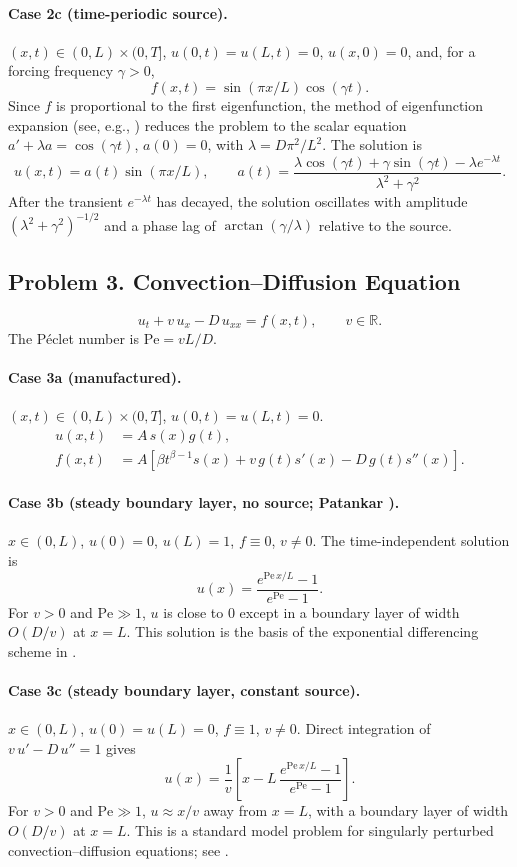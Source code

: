 \documentclass[11pt]{article}
\begin{document}
\paragraph{Case 2c (time-periodic source).}
$(x,t)\in(0,L)\times(0,T]$, $u(0,t)=u(L,t)=0$, $u(x,0)=0$, and, for a
forcing frequency $\gamma>0$,
\[
f(x,t)=\sin(\pi x/L)\cos(\gamma t).
\]
Since $f$ is proportional to the first eigenfunction, the method of
eigenfunction expansion (see, e.g., \cite[Ch.~8]{Hab13}) reduces the
problem to the scalar equation $a'+\lambda a=\cos(\gamma t)$, $a(0)=0$,
with $\lambda=D\pi^2/L^2$. The solution is
\[
u(x,t)=a(t)\sin(\pi x/L),
\qquad
a(t)=\frac{\lambda\cos(\gamma t)+\gamma\sin(\gamma t)-\lambda e^{-\lambda t}}
{\lambda^2+\gamma^2}.
\]
After the transient $e^{-\lambda t}$ has decayed, the solution
oscillates with amplitude $(\lambda^2+\gamma^2)^{-1/2}$ and a phase lag
of $\arctan(\gamma/\lambda)$ relative to the source.

\subsection*{Problem 3. Convection--Diffusion Equation}

\[
\boxed{u_t+v\,u_x-D\,u_{xx}=f(x,t)},
\qquad v\in\mathbb{R}.
\]
The P\'eclet number is $\mathrm{Pe}=vL/D$.

\paragraph{Case 3a (manufactured).}
$(x,t)\in(0,L)\times(0,T]$, $u(0,t)=u(L,t)=0$.
\[
\begin{aligned}
u(x,t)&=A\,s(x)g(t),\\
f(x,t)&=A\left[
\beta t^{\beta-1}s(x)
+v\,g(t)s'(x)-D\,g(t)s''(x)
\right].
\end{aligned}
\]

\paragraph{Case 3b (steady boundary layer, no source; Patankar \cite[Ch.~5]{Pat80}).}
$x\in(0,L)$, $u(0)=0$, $u(L)=1$, $f\equiv0$, $v\neq0$. The
time-independent solution is
\[
u(x)=\frac{e^{\mathrm{Pe}\,x/L}-1}{e^{\mathrm{Pe}}-1}.
\]
For $v>0$ and $\mathrm{Pe}\gg1$, $u$ is close to $0$ except in a boundary layer of
width $O(D/v)$ at $x=L$. This solution is the basis of the exponential
differencing scheme in \cite{Pat80}.

\paragraph{Case 3c (steady boundary layer, constant source).}
$x\in(0,L)$, $u(0)=u(L)=0$, $f\equiv1$, $v\neq0$. Direct integration of
$v\,u'-D\,u''=1$ gives
\[
u(x)=\frac{1}{v}\left[x-L\,\frac{e^{\mathrm{Pe}\,x/L}-1}{e^{\mathrm{Pe}}-1}\right].
\]
For $v>0$ and $\mathrm{Pe}\gg1$, $u\approx x/v$ away from $x=L$, with a
boundary layer of width $O(D/v)$ at $x=L$. This is a standard model
problem for singularly perturbed convection--diffusion equations; see
\cite{RST08}.
\end{document}
